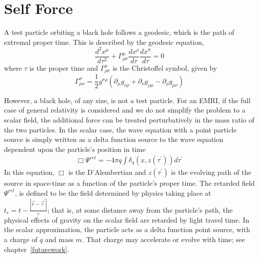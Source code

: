 

\section{Self Force}

A test particle orbiting a black hole follows a geodesic, which is the path of extremal proper time. This is described by the geodesic equation,
\begin{equation}
\frac{d^2x^\mu}{d\tau^2}+\Gamma^\mu_{\rho\sigma}\frac{dx^\rho}{d\tau}\frac{dx^\sigma}{d\tau}=0
\end{equation}
where $\tau$ is the proper time and $\Gamma^\mu_{\rho\sigma}$ is the Christoffel symbol, given by~\cite{Carroll}
\begin{equation}
\Gamma^\sigma_{\mu\nu}=\frac{1}{2}g^{\sigma\rho}(\partial_\mu g_{\nu\rho}+\partial_\nu g_{\rho\mu} - \partial_\rho g_{\mu\nu})
\end{equation}

However, a black hole, of any size, is not a test particle. For an EMRI, if the full case of general relativity is considered and we do not simplify the problem to a scalar field, the additional force can be treated perturbatively in the mass ratio of the two particles. In the scalar case, the wave equation with a point particle source is simply written as a delta function source to the wave equation dependent upon the particle's position in time~\cite{WardellSelfForceReview}
\begin{eqnarray}
  \Box\Psi^{ret}=-4\pi q\int\delta_4(x,z(\tau^\prime))d\tau^\prime
\end{eqnarray}
In this equation, $\Box$ is the D'Alembertian and $z(\tau^\prime)$ is the evolving path of the source in space-time as a function of the particle's proper time. The retarded field $\Psi^{ret}$, is defined to be the field determined by physics taking place at $t_r=t-\frac{|\vec{r}-\vec{r}^\prime|}{c}$; that is, at some distance away from the particle's path, the physical effects of gravity on the scalar field are retarded by light travel time. In the scalar approximation, the particle acts as a delta function point source, with a charge of $q$ and mass $m$. That charge may accelerate or evolve with time; see chapter~\ref{futurework}. 

